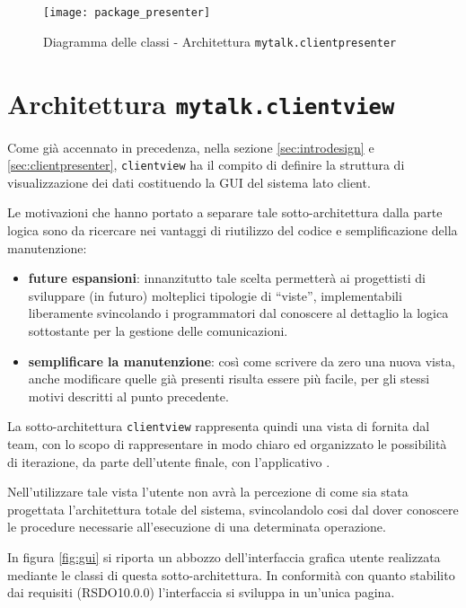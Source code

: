 \begin{figure}[H]
  \centering
  \texttt{[image: package\_presenter]}
  \caption{Diagramma delle classi - Architettura \texttt{mytalk.clientpresenter}}\label{fig:package_presenter}
  \end{figure}
\clearpage

\section{Architettura \texttt{mytalk.clientview}}\label{sec:clientview}
Come già accennato in precedenza, nella sezione \ref{sec:introdesign} e \ref{sec:clientpresenter}, \texttt{clientview} ha il compito di definire la struttura di visualizzazione dei dati costituendo la GUI del sistema lato client.

Le motivazioni che hanno portato a separare tale sotto-architettura dalla parte logica sono da ricercare nei vantaggi di riutilizzo del codice e semplificazione della manutenzione:
\begin{itemize}
 	\item \textbf{future espansioni}: innanzitutto tale scelta permetterà ai progettisti di sviluppare (in futuro) molteplici tipologie di ``viste'', implementabili liberamente svincolando i programmatori dal conoscere al dettaglio la logica sottostante per la gestione delle comunicazioni.
 	\item \textbf{semplificare la manutenzione}: così come scrivere da zero una nuova vista, anche modificare quelle già presenti risulta essere più facile, per gli stessi motivi descritti al punto precedente.
\end{itemize}

La sotto-architettura \texttt{clientview} rappresenta quindi una vista di  fornita dal team, con lo scopo di rappresentare in modo chiaro ed organizzato le possibilità di iterazione, da parte dell'utente finale, con l'applicativo \caName.

Nell'utilizzare tale vista l'utente non avrà la percezione di come sia stata progettata l'architettura totale del sistema, svincolandolo cosi dal dover conoscere le procedure necessarie all'esecuzione di una determinata operazione.

In figura \ref{fig:gui} si riporta un abbozzo dell'interfaccia grafica utente realizzata mediante le classi di questa sotto-architettura. In conformità con quanto stabilito dai requisiti (RSDO10.0.0) l'interfaccia si sviluppa in un'unica pagina.

